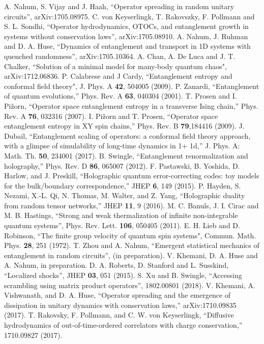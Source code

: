\documentclass[aps,prx,twocolumn,superscriptaddress,floatfix,nofootinbib,prx]{revtex4}
\renewcommand{\>}{\right\rangle}
\newcommand{\<}{\left\langle}
\begin{document}
\begin{thebibliography}{2}
A. Nahum, S. Vijay and J. Haah, ``Operator spreading in random unitary circuits'', arXiv:1705.08975.
C. von Keyserlingk, T. Rakovszky, F. Pollmann and S. L. Sondhi, ``Operator hydrodynamics, OTOCs, and entanglement growth in systems without conservation laws'', arXiv:1705.08910.
A. Nahum, J. Ruhman and D. A. Huse, ``Dynamics of entanglement and transport in 1D systems with quenched randomness'', arXiv:1705.10364.
A. Chan, A. De Luca and J. T. Chalker, ``Solution of a minimal model for many-body quantum chaos", arXiv:1712.06836.
P. Calabrese and J Cardy, ``Entanglement entropy and conformal field theory", J. Phys. A {\bf 42}, 504005 (2009).
P. Zanardi, ``Entanglement of quantum evolutions,'' Phys. Rev. A  {\bf 63}, 040304 (2001).
T. Prosen and I. Pi{\v{z}}orn, ``Operator space entanglement entropy in a transverse Ising chain,'' Phys. Rev. A {\bf 76}, 032316 (2007).
I. Pi{\v{z}}orn and T. Prosen, ``Operator space entanglement entropy in XY spin chains,'' Phys. Rev. B {\bf 79},184416 (2009).
J. Dubail,  ``Entanglement scaling of operators: a conformal field theory approach, with a glimpse of simulability of long-time dynamics in 1+ 1d,'' J. Phys. A: Math. Th. {\bf 50}, 234001 (2017).
 B. Swingle, ``Entanglement renormalization and holography,'' Phys. Rev. D {\bf 86}, 065007 (2012).
 F. Pastawski, B. Yoshida, D. Harlow, and J. Preskill, ``Holographic quantum error-correcting codes: toy models for the bulk/boundary correspondence,'' JHEP {\bf 6}, 149 (2015).
 P. Hayden, S. Nezami, X.-L. Qi, N. Thomas, M. Walter, and Z. Yang, ``Holographic duality from random tensor networks,'' JHEP {\bf 11}, 9 (2016).
M. C. Banuls, J. I. Cirac and M. B. Hastings, ``Strong and weak thermalization of infinite non-integrable quantum systems'', Phys. Rev. Lett. {\bf 106}, 050405 (2011).
E. H. Lieb and D. Robinson, ``The finite group velocity of quantum spin systems", Commun. Math. Phys. {\bf 28}, 251 (1972).
 T. Zhou and A. Nahum, ``Emergent statistical mechanics of entanglement in random circuits'', (in preparation).
V. Khemani, D. A. Huse and A. Nahum, in preparation.
D. A. Roberts, D. Stanford and L. Susskind, ``Localized shocks'', JHEP {\bf 03}, 051 (2015).
 S. Xu and B. Swingle, ``Accessing scrambling using matrix product operators'',
1802.00801 (2018).
  V. Khemani, A. Vishwanath, and D. A. Huse, ``Operator spreading and the emergence of dissipation in unitary dynamics with conservation laws,'' arXiv:1710.09835 (2017).
  T. Rakovsky, F. Pollmann, and C. W. von Keyserlingk, ``Diffusive hydrodynamics of out-of-time-ordered correlators with charge conservation,'' 1710.09827 (2017).
     
\end{thebibliography}
\end{document}
